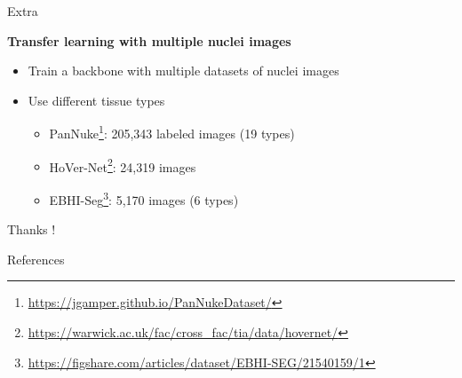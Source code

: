 \documentclass[xcolor=dvipsnames]{beamer}
\begin{document}
    \begin{frame}{Extra}
        \begin{center}
            \textbf{Transfer learning with multiple nuclei images}
        \end{center}
        \vspace{10mm}
        \begin{itemize}
            \item Train a backbone with multiple datasets of nuclei images
            \item Use different tissue types
            \begin{itemize}
                \item PanNuke\footnote{\url{https://jgamper.github.io/PanNukeDataset/}}: 205,343 labeled images (19 types)
                \item HoVer-Net\footnote{\url{https://warwick.ac.uk/fac/cross_fac/tia/data/hovernet/}}: 24,319 images
                \item EBHI-Seg\footnote{\url{https://figshare.com/articles/dataset/EBHI-SEG/21540159/1}}: 5,170 images (6 types)
            \end{itemize}
        \end{itemize}
        
    \end{frame}

    \begin{frame}
        \centering
        \Huge Thanks !
    \end{frame}
    
    \begin{frame}[allowframebreaks]{References}
	    \scriptsize
	    
        
	\end{frame}
     
\end{document}
